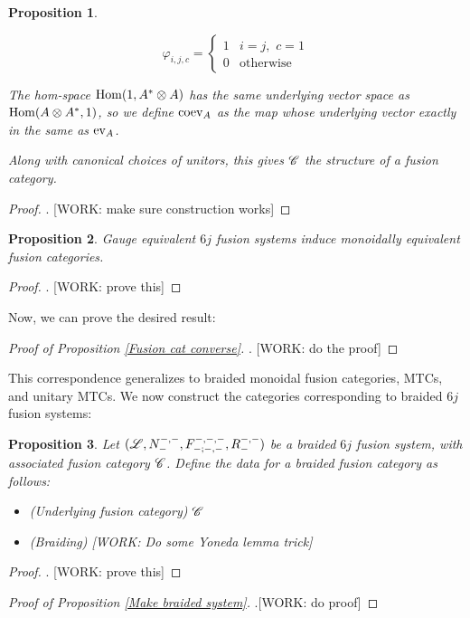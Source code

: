 \documentclass{article}
\newtheorem{proposition}{Proposition}[section]
\theoremstyle{definition}
\numberwithin{figure}{section}
\begin{document}
\begin{proposition}
\begin{itemize}
$$\varphi_{i,j,c}=
\begin{cases}
1 & i=j, \,\, c=1\\
0 & \text{otherwise}
\end{cases}$$

The hom-space $\mathrm{Hom}(1, A^{*}\otimes A)$ has the same underlying vector space as $\mathrm{Hom}(A\otimes A^{*},1)$, so we define $\mathrm{coev}_{A}$ as the map whose underlying vector exactly in the same as $\mathrm{ev}_{A}$.
\end{itemize}

Along with canonical choices of unitors, this gives $\mathscr{C}$ the structure of a fusion category.
\end{proposition}
\begin{proof}. [WORK: make sure construction works]
\end{proof}

\begin{proposition} Gauge equivalent $6j$ fusion systems induce monoidally equivalent fusion categories.
\end{proposition}
\begin{proof}. [WORK: prove this]
\end{proof}

Now, we can prove the desired result:

\begin{proof}[Proof of Proposition \ref{Fusion cat converse}]. [WORK: do the proof]
\end{proof}


This correspondence generalizes to braided monoidal fusion categories, MTCs, and unitary MTCs. We now construct the categories corresponding to braided $6j$ fusion systems:

\begin{proposition} Let $(\mathscr{L},N^{\--,\--}_{\--},F^{\--,\--,\--}_{\--;\--,\--},R^{\--,\--}_{\--})$ be a braided $6j$ fusion system, with associated fusion category $\mathscr{C}$. Define the data for a braided fusion category as follows:

\begin{itemize}
\item (Underlying fusion category) $\mathscr{C}$
\item (Braiding) [WORK: Do some Yoneda lemma trick]
\end{itemize}
\end{proposition}
\begin{proof}. [WORK: prove this]
\end{proof}

\begin{proof}[Proof of Proposition \ref{Make braided system}] .[WORK: do proof]
\end{proof}
\end{document}
